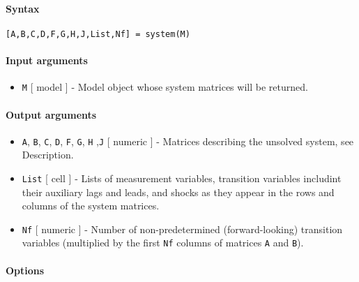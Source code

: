 


	\paragraph{Syntax}\label{syntax}

\begin{verbatim}
[A,B,C,D,F,G,H,J,List,Nf] = system(M)
\end{verbatim}

\paragraph{Input arguments}\label{input-arguments}

\begin{itemize}
\itemsep1pt\parskip0pt
\item
  \texttt{M} {[} model {]} - Model object whose system matrices will be
  returned.
\end{itemize}

\paragraph{Output arguments}\label{output-arguments}

\begin{itemize}
\item
  \texttt{A}, \texttt{B}, \texttt{C}, \texttt{D}, \texttt{F},
  \texttt{G}, \texttt{H} ,\texttt{J} {[} numeric {]} - Matrices
  describing the unsolved system, see Description.
\item
  \texttt{List} {[} cell {]} - Lists of measurement variables,
  transition variables includint their auxiliary lags and leads, and
  shocks as they appear in the rows and columns of the system matrices.
\item
  \texttt{Nf} {[} numeric {]} - Number of non-predetermined
  (forward-looking) transition variables (multiplied by the first
  \texttt{Nf} columns of matrices \texttt{A} and \texttt{B}).
\end{itemize}

\paragraph{Options}\label{options}


